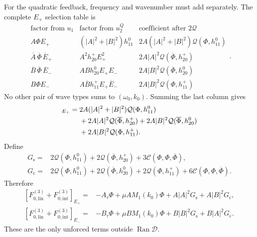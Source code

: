\documentclass[11pt]{article}
\newcommand{\cQ}{\mathcal{Q}}
\newcommand{\cC}{\mathcal{C}}
\newcommand{\cD}{\mathcal{D}}
\begin{document}
For the quadratic feedback, frequency and wavenumber must add separately.
The complete $E_+$ selection table is
\begin{equation}
\begin{array}{c|c|c}
 \text{factor from }u_1&\text{factor from }u_2^Q
 &\text{coefficient after }2\cQ\\ \hline
 A\Phi E_+&(|A|^2+|B|^2)h_{11}^0
 &2A(|A|^2+|B|^2)\cQ(\Phi,h_{11}^0)\\
 \overline A\,\overline\Phi\,\overline E_+&A^2h_{20}^+E_+^2
 &2A|A|^2\cQ(\overline\Phi,h_{20}^+)\\
 \overline B\,\overline\Phi\,\overline E_-&ABh_{20}^0E_+E_-
 &2A|B|^2\cQ(\overline\Phi,h_{20}^0)\\
 B\Phi E_-&A\overline Bh_{11}^+E_+\overline E_-
 &2A|B|^2\cQ(\Phi,h_{11}^+)
\end{array}.
 \label{eq:quadratic-Eplus-selection}
\end{equation}
No other pair of wave types sums to $(\omega_0,k_0)$.  Summing the last
column gives
\begin{align}
 [2\cQ(u_1,u_2^Q)]_{E_+}={}&
 2A(|A|^2+|B|^2)\cQ(\Phi,h_{11}^0)
 \notag\\
 &+2A|A|^2\cQ(\overline\Phi,h_{20}^+)
 +2A|B|^2\cQ(\overline\Phi,h_{20}^0)
 \notag\\
 &+2A|B|^2\cQ(\Phi,h_{11}^+).
 \label{eq:Q-feedback}
\end{align}
Define
\begin{subequations}
\label{eq:G-vectors}
\begin{align}
 G_{\mathrm{s}}={}&2\cQ(\Phi,h_{11}^0)
 +2\cQ(\overline\Phi,h_{20}^+)
 +3\cC(\Phi,\Phi,\overline\Phi),
 \label{eq:Gs}\\
 G_{\mathrm{c}}={}&2\cQ(\Phi,h_{11}^0)
 +2\cQ(\overline\Phi,h_{20}^0)
 +2\cQ(\Phi,h_{11}^+)
 +6\cC(\Phi,\Phi,\overline\Phi).
 \label{eq:Gc}
\end{align}
\end{subequations}
Therefore
\begin{subequations}
\label{eq:unforced-critical-coefficients}
\begin{align}
 [F_{0,\mathrm{lin}}^{(3)}+F_{0,\mathrm{int}}^{(3)}]_{E_+}
 ={}&-A_\tau\Phi+\mu A M_1(k_0)\Phi
 +A|A|^2G_{\mathrm{s}}+A|B|^2G_{\mathrm{c}},
 \label{eq:Eplus-coeff}\\
 [F_{0,\mathrm{lin}}^{(3)}+F_{0,\mathrm{int}}^{(3)}]_{E_-}
 ={}&-B_\tau\Phi+\mu B M_1(k_0)\Phi
 +B|B|^2G_{\mathrm{s}}+B|A|^2G_{\mathrm{c}}.
 \label{eq:Eminus-coeff}
\end{align}
\end{subequations}
These are the only unforced terms outside $\operatorname{Ran}\cD$.
\end{document}
